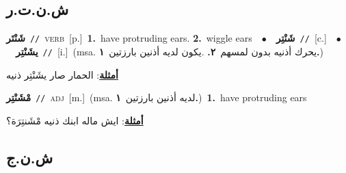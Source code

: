 \documentclass[10pt,a4paper,twoside]{article} %
\begin{document}
\begin{multicols}{2}
\vspace{-3mm}
\subsection*{\color{blue}\foreignlanguage{arabic}{ش.ن.ت.ر}\color{blue}{}} 

{\setlength\topsep{0pt}\textbf{\foreignlanguage{arabic}{شَنْتَر}}\ {\color{gray}\texttt{//}\color{black}}\ \textsc{verb}\ [p.]\ \textbf{1.}~have protruding ears.  \textbf{2.}~wiggle ears\ \ $\bullet$\ \ \setlength\topsep{0pt}\textbf{\foreignlanguage{arabic}{شَنْتِر}}\ {\color{gray}\texttt{//}\color{black}}\ [c.]\ \ $\bullet$\ \ \setlength\topsep{0pt}\textbf{\foreignlanguage{arabic}{يشَنْتِر}}\ {\color{gray}\texttt{//}\color{black}}\ [i.]\ \color{gray}(msa. \foreignlanguage{arabic}{يحرك أذنيه بدون لمسهم}~\foreignlanguage{arabic}{\textbf{٢.}}  .\foreignlanguage{arabic}{يكون لديه أذنين بارزتين}~\foreignlanguage{arabic}{\textbf{١.}})\color{black}\  \begin{flushright}\color{gray}\foreignlanguage{arabic}{\textbf{\underline{\foreignlanguage{arabic}{أمثلة}}}: الحمار صار يشَنْتِر ذنيه}\end{flushright}\color{black}} \vspace{2mm}

{\setlength\topsep{0pt}\textbf{\foreignlanguage{arabic}{مْشَنْتِر}}\ {\color{gray}\texttt{//}\color{black}}\ \textsc{adj}\ [m.]\ \color{gray}(msa. \foreignlanguage{arabic}{لديه أذنين بارزتين}~\foreignlanguage{arabic}{\textbf{١.}})\color{black}\ \textbf{1.}~have protruding ears\  \begin{flushright}\color{gray}\foreignlanguage{arabic}{\textbf{\underline{\foreignlanguage{arabic}{أمثلة}}}: ايش ماله ابنك ذنيه مْشَنتِرَة؟}\end{flushright}\color{black}} \vspace{2mm}

\vspace{-3mm}
\subsection*{\color{blue}\foreignlanguage{arabic}{ش.ن.ج}\color{blue}{}} 


\end{multicols}
\end{document}

